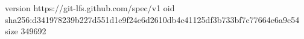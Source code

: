 version https://git-lfs.github.com/spec/v1
oid sha256:d341978239b227d551d1e9f24e6d2610db4c41125df3b733bf7c77664e6a9c54
size 349692
